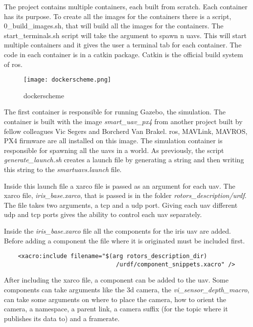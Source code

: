 
The project contains multiple containers, each built from scratch. Each container has its purpose. 
To create all the images for the containers there is a script, 0\_build\_images.sh, that will build 
all the images for the containers. 
The start\_terminals.sh script will take the argument to spawn n \acp{uav}. 
This will start multiple containers and it gives the user a terminal tab for each container. 
The code in each container is in a catkin package. Catkin is the official build system of \acs{ros}. 

\begin{figure}[ht]
    \centering
    \texttt{[image: dockerscheme.png]}
    \caption[dockerscheme]{dockerscheme}
\end{figure}

The first container is responsible for running Gazebo, the simulation. 
The container is built with the image \textit{smart\_uav\_px4} 
from another project built by fellow colleagues Vic Segers and Borcherd Van Brakel. \acs{ros}, MAVLink, 
MAVROS, PX4 firmware are all installed on this image. 
The simulation container is responsible for spawning all the \acp{uav} in a world. As previously, 
the script \textit{generate\_launch.sh} creates a launch file 
by generating a string and then writing this string to the \textit{smartuavs.launch} file. 

Inside this launch file a xarco file is passed as an argument for each \acs{uav}. 
The xarco file, \textit{iris\_base.xarco}, that is passed is in the folder \textit{rotors\_description/urdf}. 
The file takes two arguments, a \acs{tcp} and a \acs{udp} port. Giving each \acs{uav} different \acs{udp} and 
\acs{tcp} ports gives the ability to control each \acs{uav} separately. 

Inside the \textit{iris\_base.xarco} file all the components for the iris \acs{uav} are added. 
Before adding a component the file where it is originated must be included first. 


\begin{verbatim}
    <xacro:include filename="$(arg rotors_description_dir)
                                /urdf/component_snippets.xacro" />

\end{verbatim}

After including the xarco file, a component can be added to the \acs{uav}. 
Some components can take arguments like the \acs{3d} camera, the \textit{vi\_sensor\_depth\_macro}, 
can take some arguments on where to place the camera, how to orient the camera, 
a namespace, a parent link, a camera suffix (for the topic where it publishes its data to) and a framerate. 

